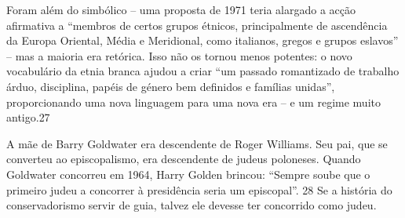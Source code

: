 Foram além do simbólico – uma proposta de 1971 teria alargado a acção afirmativa a “membros de certos grupos étnicos, principalmente de ascendência da Europa Oriental, Média e Meridional, como italianos, gregos e grupos eslavos” – mas a maioria era retórica. Isso não os tornou menos potentes: o novo vocabulário da etnia branca ajudou a criar “um passado romantizado de trabalho árduo, disciplina, papéis de género bem definidos e famílias unidas”, proporcionando uma nova linguagem para uma nova era – e um regime muito antigo.{\color{blue}27}
 \par 
A mãe de Barry Goldwater era descendente de Roger Williams. Seu pai, que se converteu ao episcopalismo, era descendente de judeus poloneses. Quando Goldwater concorreu em 1964, Harry Golden brincou: “Sempre soube que o primeiro judeu a concorrer à presidência seria um episcopal”. {\color{blue}28} Se a história do conservadorismo servir de guia, talvez ele devesse ter concorrido como judeu.